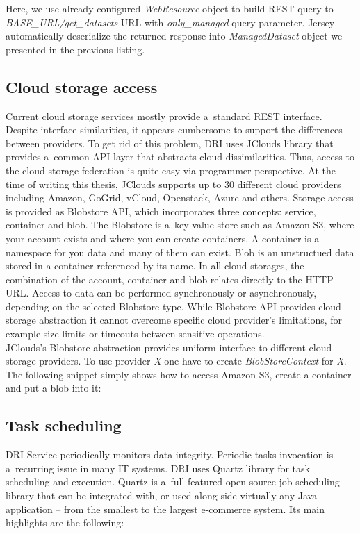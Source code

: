 Here, we use already configured \textit{WebResource} object to build REST query to 
\textit{BASE\_URL/get\_datasets} URL with \textit{only\_managed} query parameter. Jersey
automatically deserialize the returned response into \textit{ManagedDataset} object
we presented in the previous listing.\\

\subsection{Cloud storage access}
Current cloud storage services mostly provide a~standard REST interface.
Despite interface similarities, it appears cumbersome to support the
differences between providers. To get rid of this problem, DRI uses JClouds
\cite{jclouds} library that provides a~common API layer that abstracts cloud
dissimilarities. Thus, access to the cloud storage federation is quite easy
via programmer perspective. At the time of writing this thesis, JClouds
supports up to 30 different cloud providers including Amazon, GoGrid, vCloud,
Openstack, Azure and others. Storage access is provided as Blobstore API, which
incorporates three concepts: service, container and blob. The Blobstore is
a~key-value store such as Amazon S3, where your account exists and where you
can create containers. A container is a namespace for you data and many of them
can exist. Blob is an unstructued data stored in a container referenced by
its name. In all cloud storages, the combination of the account, container and
blob relates directly to the HTTP URL. Access to data can be performed
synchronously or asynchronously, depending on the selected Blobstore type.
While Blobstore API provides cloud storage abstraction it cannot overcome
specific cloud provider's limitations, for example size limits or timeouts
between sensitive operations.\\

JClouds's Blobstore abstraction provides uniform interface to different cloud storage
providers. To use provider \textit{X} one have to create \textit{BlobStoreContext}
for \textit{X}. The following snippet simply shows how to access Amazon S3, create a
container and put a blob into it:



\subsection{Task scheduling}
DRI Service periodically monitors data integrity. Periodic tasks invocation
is a~recurring issue in many IT systems. DRI uses Quartz library \cite{quartz}
for task scheduling and execution. Quartz is a~full-featured open source job scheduling
library that can be integrated with, or used along side virtually any Java
application -- from the smallest to the largest e-commerce system. Its main highlights
are the following:


